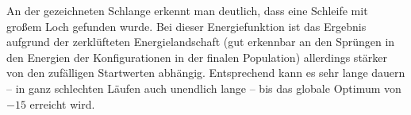 \documentclass[parskip=half,paper=a4]{scrartcl}
\begin{document}
    An der gezeichneten Schlange erkennt man deutlich, dass eine Schleife mit
    großem Loch gefunden wurde. Bei dieser Energiefunktion ist das Ergebnis
    aufgrund der zerklüfteten Energielandschaft (gut erkennbar an den Sprüngen
    in den Energien der Konfigurationen in der finalen Population) allerdings
    stärker von den zufälligen Startwerten abhängig. Entsprechend kann es sehr
    lange dauern -- in ganz schlechten Läufen auch unendlich lange -- bis
    das globale Optimum von $-15$ erreicht wird. 
\end{document}
